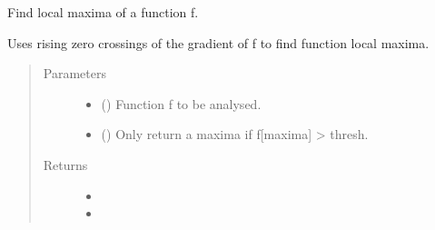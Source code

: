 \documentclass[letterpaper,10pt,english]{sphinxmanual}
\begin{document}
\begin{fulllineitems}
\label{\detokenize{tes:tes.calibration.maxima}}
\sphinxAtStartPar
Find local maxima of a function f.

\sphinxAtStartPar
Uses rising zero crossings of the gradient of f to find function
local maxima.
\begin{quote}\begin{description}
\item[{Parameters}] \leavevmode\begin{itemize}
\item {} 
\sphinxAtStartPar
{} () \textendash{} Function f to be analysed.

\item {} 
\sphinxAtStartPar
{} () \textendash{} Only return a maxima if f{[}maxima{]} \textgreater{} thresh.

\end{itemize}

\item[{Returns}] \leavevmode
\sphinxAtStartPar
\begin{itemize}
\item {} 
\sphinxAtStartPar
{}

\item {} 
\sphinxAtStartPar
{}

\end{itemize}


\end{description}\end{quote}

\end{fulllineitems}

\end{document}
